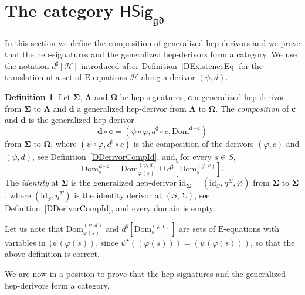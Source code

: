 \documentclass[a4paper, reqno]{amsbook}
\newcommand{\vs}[1]{\mathbin{\downarrow}#1}
\newcommand{\sig}[1]{\mathbf{#1}}             %
\newcommand{\Dom}{\mathrm{Dom}}
\newcommand{\gd}{\mathfrak{gd}}              %
\newcommand{\id}{\mathrm{id}}
\theoremstyle{plain}
\theoremstyle{definition}
\newtheorem{definition}[theorem]{Definition}
\begin{document}
\section{The category \texorpdfstring{$\mathsf{HSig}_{\gd}$}{HSiggd}}\label{SHepSigCat}

In this section we define the composition of generalized hep-derivors and we prove that the hep-signatures and the generalized hep-derivors form a category.
We use the notation $d^{\sharp}[\mathcal{H}]$ introduced after Definition~\ref{DExistenceEq} for the translation of a set of $\mathrm{E}$-equations $\mathcal{H}$ along a derivor $(\psi,d)$.

\begin{definition}\label{DGenHepDerivorCompId}
Let $\sig{\Sigma}$, $\sig{\Lambda}$ and $\sig{\Omega}$ be hep-signatures, $\mathbf{c}$ a generalized hep-derivor from $\sig{\Sigma}$ to $\sig{\Lambda}$ and $\mathbf{d}$ a generalized hep-derivor from $\sig{\Lambda}$ to $\sig{\Omega}$.
The \emph{composition} of $\mathbf{c}$ and $\mathbf{d}$ is the generalized hep-derivor
$$
\mathbf{d}\circ\mathbf{c}=\left(\psi\circ\varphi,d^{\sharp}\circ c,\Dom^{\mathbf{d}\circ\mathbf{c}}\right)
$$
from $\sig{\Sigma}$ to $\sig{\Omega}$, where $(\psi\circ\varphi,d^{\sharp}\circ c)$ is the composition of the derivors $(\varphi,c)$ and $(\psi,d)$, see Definition~\ref{DDerivorCompId}, and, for every $s\in S$,
$$
\Dom^{\mathbf{d}\circ\mathbf{c}}_{s}=\Dom^{(\psi,d)}_{\varphi(s)}\cup d^{\sharp}\left[\Dom^{(\varphi,c)}_{s}\right].
$$
The \emph{identity} at $\sig{\Sigma}$ is the generalized hep-derivor $\id_{\sig{\Sigma}}=(\id_{S},\eta^{\Sigma},\varnothing)$ from $\sig{\Sigma}$ to $\sig{\Sigma}$, where $(\id_{S},\eta^{\Sigma})$ is the identity derivor at $(S,\Sigma)$, see Definition~\ref{DDerivorCompId}, and every domain is empty.
\end{definition}

Let us note that $\Dom^{(\psi,d)}_{\varphi(s)}$ and $d^{\sharp}[\Dom^{(\varphi,c)}_{s}]$ are sets of $\mathrm{E}$-equations with variables in $\vs{\psi(\varphi(s))}$, since $\psi^{\star}((\varphi(s)))=(\psi(\varphi(s)))$, so that the above definition is correct.

We are now in a position to prove that the hep-signatures and the generalized hep-derivors form a category.
\end{document}
